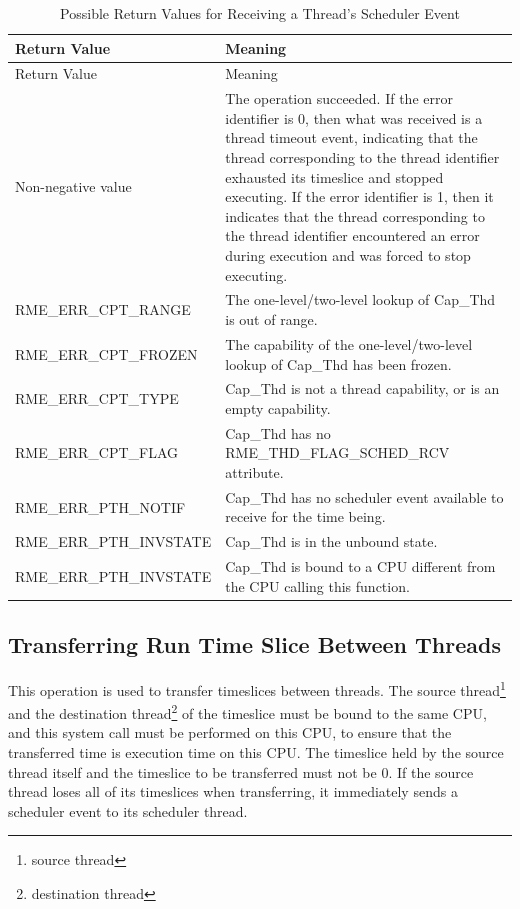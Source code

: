 \begin{xltabular}{\textwidth}{@{}>{\hsize\raggedright\arraybackslash}X>{\hsize\raggedright\arraybackslash}X@{}}
\caption{Possible Return Values for Receiving a Thread's Scheduler Event}\label{tab:4-33-receive-thread-scheduler-event-return-values}\\
\toprule
Return Value & Meaning\tabularnewline
\endfirsthead
\toprule
Return Value & Meaning\tabularnewline
\midrule
\endhead
\bottomrule
\endlastfoot
    Non-negative value & The operation succeeded. If the error identifier is 0, then what was received is a thread timeout event, indicating that the thread corresponding to the thread identifier exhausted its timeslice and stopped executing. If the error identifier is 1, then it indicates that the thread corresponding to the thread identifier encountered an error during execution and was forced to stop executing.\tabularnewline
    RME\_ERR\_CPT\_RANGE & The one-level/two-level lookup of Cap\_Thd is out of range.\tabularnewline
    RME\_ERR\_CPT\_FROZEN & The capability of the one-level/two-level lookup of Cap\_Thd has been frozen.\tabularnewline
    RME\_ERR\_CPT\_TYPE & Cap\_Thd is not a thread capability, or is an empty capability.\tabularnewline
    RME\_ERR\_CPT\_FLAG & Cap\_Thd has no RME\_THD\_FLAG\_SCHED\_RCV attribute.\tabularnewline
    RME\_ERR\_PTH\_NOTIF & Cap\_Thd has no scheduler event available to receive for the time being.\tabularnewline
    RME\_ERR\_PTH\_INVSTATE & Cap\_Thd is in the unbound state.\tabularnewline
    RME\_ERR\_PTH\_INVSTATE & Cap\_Thd is bound to a CPU different from the CPU calling this function.\tabularnewline
\end{xltabular}
\nopagebreak[4]

\subsection{Transferring Run Time Slice Between Threads}\label{subsec:4-transfer-run-time-slice-between-threads}

This operation is used to transfer timeslices between threads. The source thread\footnote{source thread} and the destination thread\footnote{destination thread} of the timeslice must be bound to the same CPU, and this system call must be performed on this CPU, to ensure that the transferred time is execution time on this CPU. The timeslice held by the source thread itself and the timeslice to be transferred must not be 0. If the source thread loses all of its timeslices when transferring, it immediately sends a scheduler event to its scheduler thread.

